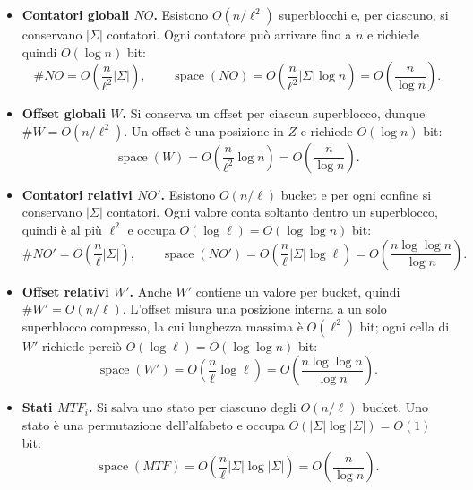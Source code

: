 \documentclass{article}
\theoremstyle{definition}
\numberwithin{equation}{section}
\begin{document}
\begin{itemize}
    \item \textbf{Contatori globali $NO$.} Esistono $O(n/\ell^2)$ superblocchi e, per ciascuno, si conservano $|\Sigma|$ contatori. Ogni contatore può arrivare fino a $n$ e richiede quindi $O(\log n)$ bit:
          \[
              \#NO
              =
              O\!\left(\frac{n}{\ell^2}|\Sigma|\right),
              \qquad
              \operatorname{space}(NO)
              =
              O\!\left(\frac{n}{\ell^2}|\Sigma|\log n\right)
              =
              O\!\left(\frac{n}{\log n}\right).
          \]

    \item \textbf{Offset globali $W$.} Si conserva un offset per ciascun superblocco, dunque $\#W=O(n/\ell^2)$. Un offset è una posizione in $Z$ e richiede $O(\log n)$ bit:
          \[
              \operatorname{space}(W)
              =
              O\!\left(\frac{n}{\ell^2}\log n\right)
              =
              O\!\left(\frac{n}{\log n}\right).
          \]

    \item \textbf{Contatori relativi $NO'$.} Esistono $O(n/\ell)$ bucket e per ogni confine si conservano $|\Sigma|$ contatori. Ogni valore conta soltanto dentro un superblocco, quindi è al più $\ell^2$ e occupa $O(\log\ell)=O(\log\log n)$ bit:
          \[
              \#NO'
              =
              O\!\left(\frac{n}{\ell}|\Sigma|\right),
              \qquad
              \operatorname{space}(NO')
              =
              O\!\left(\frac{n}{\ell}|\Sigma|\log\ell\right)
              =
              O\!\left(\frac{n\log\log n}{\log n}\right).
          \]

    \item \textbf{Offset relativi $W'$.} Anche $W'$ contiene un valore per bucket, quindi $\#W'=O(n/\ell)$. L'offset misura una posizione interna a un solo superblocco compresso, la cui lunghezza massima è $O(\ell^2)$ bit; ogni cella di $W'$ richiede perciò $O(\log\ell)=O(\log\log n)$ bit:
          \[
              \operatorname{space}(W')
              =
              O\!\left(\frac{n}{\ell}\log\ell\right)
              =
              O\!\left(\frac{n\log\log n}{\log n}\right).
          \]

    \item \textbf{Stati $MTF_i$.} Si salva uno stato per ciascuno degli $O(n/\ell)$ bucket. Uno stato è una permutazione dell'alfabeto e occupa $O(|\Sigma|\log|\Sigma|)=O(1)$ bit:
          \[
              \operatorname{space}(MTF)
              =
              O\!\left(\frac{n}{\ell}|\Sigma|\log|\Sigma|\right)
              =
              O\!\left(\frac{n}{\log n}\right).
          \]
\end{itemize}
\end{document}
